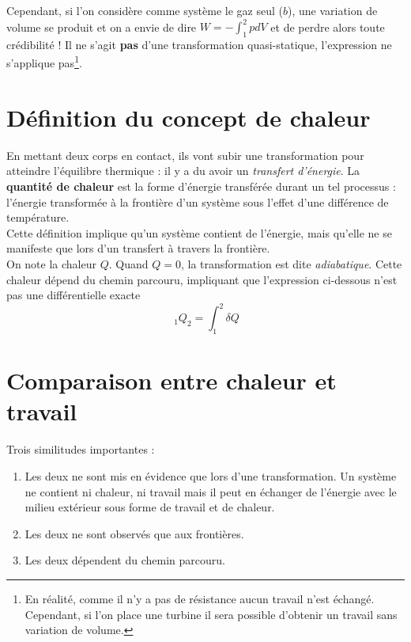 Cependant, si l'on considère comme système le gaz seul ($b$),  une variation 
de volume se produit et on a envie de dire $W = -\int_1^2 pdV$ et 
de perdre alors toute crédibilité ! Il ne s'agit \textbf{pas} d'une 
transformation quasi-statique, l'expression ne s'applique pas\footnote{
En réalité, comme il n'y a pas de résistance aucun travail n'est 
échangé. Cependant, si l'on place une turbine il sera possible d'obtenir 
un travail sans variation de volume.}.


\section{Définition du concept de chaleur}
En mettant deux corps en contact, ils vont subir une transformation 
pour atteindre l'équilibre thermique : il y a du avoir un \textit{
transfert d'énergie}. La \textbf{quantité de chaleur} est la forme 
d'énergie transférée durant un tel processus : l'énergie transformée
à la frontière d'un système sous l'effet d'une différence de 
température.\\

Cette définition implique qu'un système contient de l'énergie, mais 
qu'elle ne se manifeste que lors d'un transfert à travers la frontière.\\
On note la chaleur $Q$. Quand $Q=0$, la transformation est dite 
\textit{adiabatique}. Cette chaleur dépend du chemin parcouru, impliquant 
que l'expression ci-dessous n'est pas une différentielle exacte
\begin{equation}
\ _1Q_2 = \int_1^2 \delta Q
\end{equation}


\section{Comparaison entre chaleur et travail}
Trois similitudes importantes :
\begin{enumerate}
\item Les deux ne sont mis en évidence que lors d'une transformation. 
Un système ne contient ni chaleur, ni travail mais il peut en échanger 
de l'énergie avec le milieu extérieur sous forme de travail et de chaleur.
\item Les deux ne sont observés que aux frontières.
\item Les deux dépendent du chemin parcouru.
\end{enumerate}


